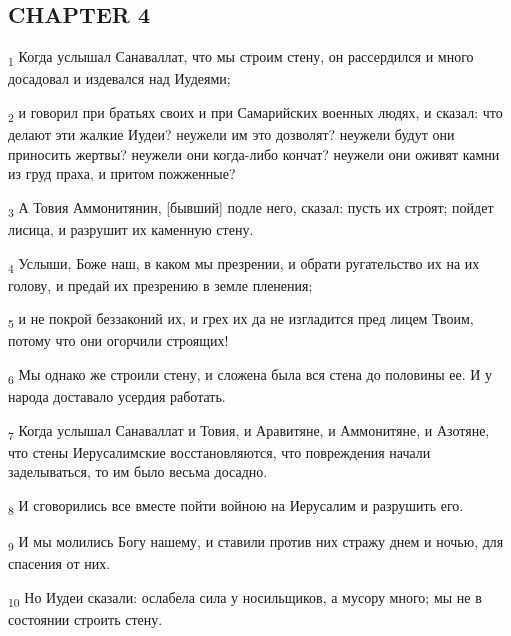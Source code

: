 \subsection{CHAPTER 4}
\begin{tcolorbox}
\textsubscript{1} Когда услышал Санаваллат, что мы строим стену, он рассердился и много досадовал и издевался над Иудеями;
\end{tcolorbox}
\begin{tcolorbox}
\textsubscript{2} и говорил при братьях своих и при Самарийских военных людях, и сказал: что делают эти жалкие Иудеи? неужели им это дозволят? неужели будут они приносить жертвы? неужели они когда-либо кончат? неужели они оживят камни из груд праха, и притом пожженные?
\end{tcolorbox}
\begin{tcolorbox}
\textsubscript{3} А Товия Аммонитянин, [бывший] подле него, сказал: пусть их строят; пойдет лисица, и разрушит их каменную стену.
\end{tcolorbox}
\begin{tcolorbox}
\textsubscript{4} Услыши, Боже наш, в каком мы презрении, и обрати ругательство их на их голову, и предай их презрению в земле пленения;
\end{tcolorbox}
\begin{tcolorbox}
\textsubscript{5} и не покрой беззаконий их, и грех их да не изгладится пред лицем Твоим, потому что они огорчили строящих!
\end{tcolorbox}
\begin{tcolorbox}
\textsubscript{6} Мы однако же строили стену, и сложена была вся стена до половины ее. И у народа доставало усердия работать.
\end{tcolorbox}
\begin{tcolorbox}
\textsubscript{7} Когда услышал Санаваллат и Товия, и Аравитяне, и Аммонитяне, и Азотяне, что стены Иерусалимские восстановляются, что повреждения начали заделываться, то им было весьма досадно.
\end{tcolorbox}
\begin{tcolorbox}
\textsubscript{8} И сговорились все вместе пойти войною на Иерусалим и разрушить его.
\end{tcolorbox}
\begin{tcolorbox}
\textsubscript{9} И мы молились Богу нашему, и ставили против них стражу днем и ночью, для спасения от них.
\end{tcolorbox}
\begin{tcolorbox}
\textsubscript{10} Но Иудеи сказали: ослабела сила у носильщиков, а мусору много; мы не в состоянии строить стену.
\end{tcolorbox}
